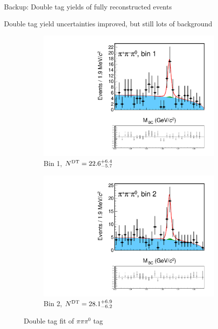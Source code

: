 \documentclass{beamer}
\begin{document}
\begin{frame}{Backup: Double tag yields of fully reconstructed events}
  \begin{center}
    Double tag yield uncertainties improved, but still lots of background
  \end{center}
  \begin{figure}
    \centering
    \begin{subfigure}{0.4\textwidth}
      \includegraphics[width = 1.0\textwidth,trim={0 5cm 0 0},clip=true]{Plots/DoubleTagYield_DoubleTag_CP_KKpipi_vs_pipipi0_SignalBin1.pdf}
      \caption{Bin 1, $N^{\rm DT} = 22.6^{+6.4}_{-5.7}$}
    \end{subfigure}%
    \begin{subfigure}{0.4\textwidth}
      \includegraphics[width = 1.0\textwidth,trim={0 5cm 0 0},clip=true]{Plots/DoubleTagYield_DoubleTag_CP_KKpipi_vs_pipipi0_SignalBin2.pdf}
      \caption{Bin 2, $N^{\rm DT} = 28.1^{+6.9}_{-6.2}$}
    \end{subfigure}
    \caption{Double tag fit of $\pi\pi\pi^0$ tag}
  \end{figure}
\end{frame}
\end{document}
